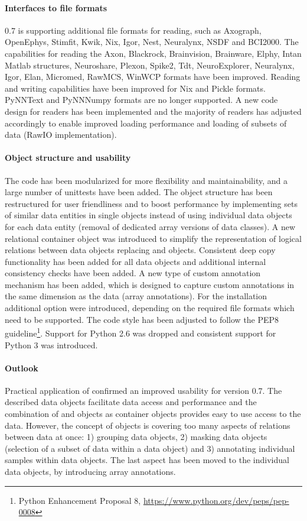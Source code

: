 \paragraph{Interfaces to file formats}
 0.7 is supporting additional file formats for reading, such as Axograph, OpenEphys, Stimfit, Kwik, Nix, Igor, Nest, Neuralynx, NSDF and BCI2000. The capabilities for reading the Axon, Blackrock, Brainvision, Brainware, Elphy, Intan Matlab structures, Neuroshare, Plexon, Spike2, Tdt, NeuroExplorer, Neuralynx, Igor, Elan, Micromed, RawMCS, WinWCP formats have been improved. Reading and writing capabilities have been improved for Nix and Pickle formats. PyNNText and PyNNNumpy formats are no longer supported. A new code design for readers has been implemented and the majority of readers has adjusted accordingly to enable improved loading performance and loading of subsets of data (RawIO implementation). 
\paragraph{Object structure and usability}
The code has been modularized for more flexibility and maintainability, and a large number of unittests have been added. The object structure has been restructured for user friendliness and to boost performance by implementing sets of similar data entities in single objects instead of using individual data objects for each data entity (removal of dedicated array versions of data classes). A new relational container object  was introduced to simplify the representation of logical relations between data objects replacing  and  objects. Consistent deep copy functionality has been added for all data objects and additional internal consistency checks have been added. A new type of custom annotation mechanism has been added, which is designed to capture custom annotations in the same dimension as the data (array annotations). For the installation additional option were introduced, depending on the required file formats which need to be supported. The code style has been adjusted to follow the PEP8 guideline\footnote{Python Enhancement Proposal 8, \url{https://www.python.org/dev/peps/pep-0008}}\citep{PEP8StyleGuideforPythonCode_}. Support for Python 2.6 was dropped and consistent support for Python 3 was introduced.


\paragraph{Outlook}
Practical application of  confirmed an improved usability for version 0.7. The described data objects facilitate data access and performance and the combination of  and  objects as container objects provides easy to use access to the data. However, the concept of  objects is covering too many aspects of relations between data at once: 1) grouping data objects, 2) masking data objects (selection of a subset of data within a data object) and 3) annotating individual samples within data objects. The last aspect has been moved to the individual data objects, by introducing array annotations. 

